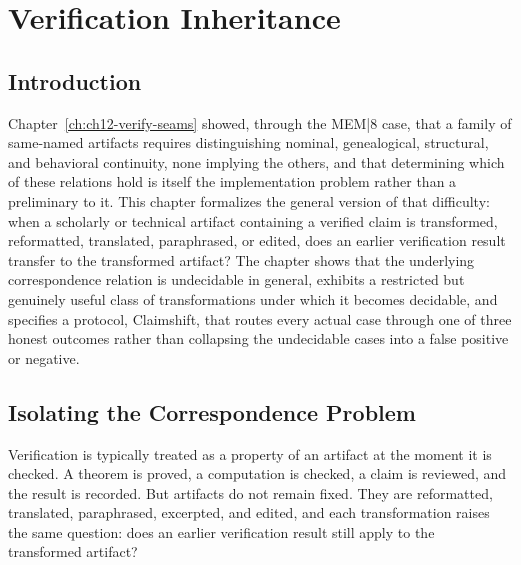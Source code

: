 
\chapter{Verification Inheritance}
\label{ch:ch13-verification-inheritance}
\section{Introduction}

Chapter~\ref{ch:ch12-verify-seams} showed, through the MEM|8 case, that a family of same-named artifacts requires distinguishing nominal, genealogical, structural, and behavioral continuity, none implying the others, and that determining which of these relations hold is itself the implementation problem rather than a preliminary to it. This chapter formalizes the general version of that difficulty: when a scholarly or technical artifact containing a verified claim is transformed, reformatted, translated, paraphrased, or edited, does an earlier verification result transfer to the transformed artifact? The chapter shows that the underlying correspondence relation is undecidable in general, exhibits a restricted but genuinely useful class of transformations under which it becomes decidable, and specifies a protocol, Claimshift, that routes every actual case through one of three honest outcomes rather than collapsing the undecidable cases into a false positive or negative.

\section{Isolating the Correspondence Problem}

Verification is typically treated as a property of an artifact at the moment it is checked. A theorem is proved, a computation is checked, a claim is reviewed, and the result is recorded. But artifacts do not remain fixed. They are reformatted, translated, paraphrased, excerpted, and edited, and each transformation raises the same question: does an earlier verification result still apply to the transformed artifact?

